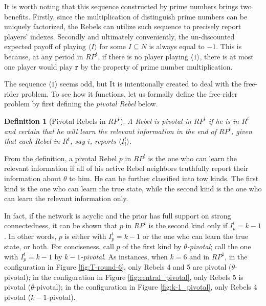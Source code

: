 \documentclass[12pt,letter]{article}
\newtheorem{definition}{Definition}[section]
\theoremstyle{definition}
\theoremstyle{remark}
\theoremstyle{claim}
\begin{document}
It is worth noting that this sequence constructed by prime numbers brings two benefits. Firstly, since the multiplication of distinguish prime numbers can be uniquely factorized, the Rebels can utilize such sequence to precisely report players' indexes. Secondly and ultimately conveniently, the un-discounted expected payoff of playing $\langle I \rangle$ for some $I\subseteq N$ is always equal to $-1$. This is because, at any period in $RP^{t}$, if there is no player playing $\langle 1 \rangle$, there is at most one player would play \textbf{r} by the property of prime number multiplication. 

The sequence $\langle 1 \rangle$ seems odd, but It is intentionally created to deal with the free-rider problem. To see how it functions, let us formally define the free-rider problem by first defining the \textit{pivotal Rebel} below.
\begin{definition}[Pivotal Rebels in $RP^t$]
A Rebel is pivotal in $RP^t$ if he is in $R^t$ and certain that he will learn the relevant information in the end of $RP^t$, given that each Rebel in $R^t$, say $i$, reports $\langle I^t_i \rangle$.
\end{definition}

From the definition, a pivotal Rebel $p$ in $RP^t$ is the one who can learn the relevant information if all of his active Rebel neighbors truthfully report their information about $\theta$ to him. He can be further classified into tow kinds. The first kind is the one who can learn the true state, while the second kind is the one who can learn the relevant information only. 

In fact, if the network is acyclic and the prior has full support on strong connectedness, it can be shown that $p$ in $RP^{t}$ is the second kind only if $I^{t}_p=k-1$. In other words, $p$ is either with $I^{t}_p=k-1$ or the one who can learn the true state, or both. For conciseness, call $p$ of the first kind by \textit{$\theta$-pivotal}; call the one with $I^t_p=k-1$ by \textit{$k-1$-pivotal}. As instances, when $k=6$ and in $RP^1$, in the configuration in Figure \ref{fig:T-round-6}, only Rebels 4 and 5 are pivotal ($\theta$-pivotal); in the configuration in Figure \ref{fig:central_pivotal}, only Rebels 5 is pivotal ($\theta$-pivotal); in the configuration in Figure \ref{fig:k-1_pivotal}, only Rebels 4 pivotal ($k-1$-pivotal).
\end{document}

